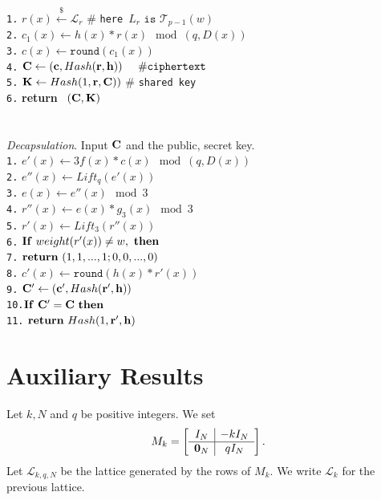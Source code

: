 \documentclass{amsart}
\numberwithin{equation}{section}
\begin{document}
{\texttt{1.}  $r(x)\xleftarrow{\$} {\mathcal{L}}_r$ \hspace{10pt} \# {\texttt{here}}\ $L_r \texttt{ is } {\mathcal{T}}_{p-1}(w)$\\
\texttt{2.} $c_1(x)\leftarrow h(x)*r(x)\mod{(q,D(x))}$ \\
\texttt{3.} $c(x)\leftarrow {\texttt{round}}(c_1(x))$\\
\texttt{4.} ${\bf C}\leftarrow ({\bf c},Hash({\bf r},{\bf h}))\hspace{14pt} \# {\texttt{ciphertext}}$\\
\texttt{5.}  ${\bf K}\leftarrow Hash(1,{\bf r},{\bf C}))  $ \hspace{10pt} \# {\texttt{shared key}}\\
\texttt{6.}  {\bf return} \ $({\bf C},{\bf K})$\\
\ \\\\
{\it Decapsulation}. Input ${\bf C}$ and the public, secret key.
\ \\
\texttt{1.}  $e'(x)\leftarrow 3f(x)*c(x)\mod{(q,D(x))}$ \\
\texttt{2.}  $e''(x)\leftarrow Lift_q(e'(x))$\\
\texttt{3.}  $e(x)\leftarrow e''(x)\mod{3}$\\
\texttt{4.}  $r''(x) \leftarrow e(x)*g_3(x) \mod{3}$ \\
\texttt{5.}  $r'(x) \leftarrow Lift_3(r''(x))$  \\
\texttt{6.}  ${\bf If}\ weight(r'(x))\not=w, \ {\bf then}$\\ 
\texttt{7.} \hspace{10pt} ${\bf return} \ (1,1,...,1;0,0,...,0)$\\ 
\texttt{8.} $c'(x) \leftarrow {\texttt{round}}(h(x)*r'(x))$\\ 
\texttt{9.}  ${\bf C}'\leftarrow ({\bf c}',Hash({\bf r}',{\bf h}))$\\
\texttt{10.}${\bf{If}}\ {\bf C}'={\bf C}\ {\bf{then}}$ \\
\texttt{11.} \hspace{9pt} ${\bf return}\ Hash(1,{\bf r}',{\bf h})$
\section{Auxiliary Results}
	Let $k, N$ and $q$ be positive integers.	
We set 	
	$$M_k=
		\left[\begin{array}{c|c}
		I_N & -kI_N  \\
		\hline
		{\bf 0}_N & qI_N   \\
		\end{array}\right].
		$$ 
Let ${\mathcal{L}}_{k,q,N}$ be the lattice generated by the rows of $M_k.$ We write ${\mathcal{L}}_{k}$ for the previous lattice.

}
\end{document}
